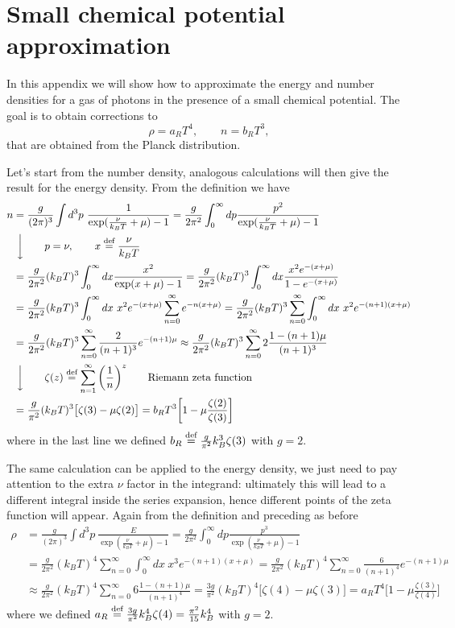 \section{Small chemical potential approximation}
\label{sec:SmallChemicalPotential}
In this appendix we will show how to approximate the energy and number densities for a gas of photons in the presence of a small chemical potential.
The goal is to obtain corrections to  
$$\rho=a_RT^4,\qquad n=b_RT^3,$$ that are obtained from the Planck distribution.

Let's start from the number density, analogous calculations will then give the result for the energy density. From the definition we have
\begin{align}
    n&=\frac{g}{(2\pi)^3}\int d^3p\ \frac{1}{\exp(\frac{\nu}{k_BT}+\mu)-1}=\frac{g}{2\pi^2}\int_0^\infty dp \frac{p^2 }{\exp(\frac{\nu}{k_BT}+\mu)-1}\nonumber\\&\ \bigg\downarrow\qquad p=\nu,\qquad x\defeq\frac{\nu}{k_BT}\nonumber\\
    &=\frac{g}{2\pi^2}(k_BT)^3\int_0^\infty dx \frac{x^2}{\exp(x+\mu)-1}=\frac{g}{2\pi^2}(k_BT)^3\int_0^\infty dx \frac{x^2e^{-(x+\mu)}}{1-e^{-(x+\mu)}}\nonumber\\&=\frac{g}{2\pi^2}(k_BT)^3\int_0^\infty dx\ x^2e^{-(x+\mu)}\sum_{n=0}^{\infty}e^{-n(x+\mu)}=\frac{g}{2\pi^2}(k_BT)^3\sum_{n=0}^{\infty}\int_0^\infty dx\ x^2e^{-(n+1)(x+\mu)}\nonumber\\&=\frac{g}{2\pi^2}(k_BT)^3\sum_{n=0}^{\infty}\frac{2}{(n+1)^3}e^{-(n+1)\mu}\approx\frac{g}{2\pi^2}(k_BT)^3\sum_{n=0}^{\infty}2\frac{1-(n+1)\mu}{(n+1)^3}\nonumber\\&\ \bigg \downarrow\qquad \zeta(z)\defeq\sum_{n=1}^\infty\bigg(\frac{1}{n}\bigg)^z\qquad\text{Riemann zeta function}\nonumber\\
    &=\frac{g}{\pi^2}(k_BT)^3\big[\zeta(3)-\mu\zeta(2)\big]=b_RT^3\bigg[1-\mu\frac{\zeta(2)}{\zeta(3)}\bigg]\,\label{eq:SmallChemicalPotential_n}
\end{align}
where in the last line we defined $b_R\stackrel{\text{def}}{=}\frac{g}{\pi^2}k_B^3\zeta(3)$ with $g=2$.

The same calculation can be applied to the energy density, we just need to pay attention to the extra $\nu$ factor in the integrand: ultimately this will lead to a different integral inside the series expansion, hence different points of the zeta function will appear. Again from the definition and preceding as before
\begin{align}
    \rho&=\frac{g}{(2\pi)^3}\int d^3p\ \frac{E}{\exp(\frac{\nu}{k_BT}+\mu)-1}=\frac{g}{2\pi^2}\int_0^\infty dp \frac{p^3}{\exp(\frac{\nu}{k_BT}+\mu)-1}\nonumber\\
    &=\frac{g}{2\pi^2}(k_BT)^4\sum_{n=0}^{\infty}\int_0^\infty dx\ x^3e^{-(n+1)(x+\mu)}\nonumber=\frac{g}{2\pi^2}(k_BT)^4\sum_{n=0}^{\infty}\frac{6}{(n+1)^4}e^{-(n+1)\mu}\\&\approx\frac{g}{2\pi^2}(k_BT)^4\sum_{n=0}^{\infty}6\frac{1-(n+1)\mu}{(n+1)^4}=\frac{3g}{\pi^2}(k_BT)^4\big[\zeta(4)-\mu\zeta(3)\big]=a_RT^4\bigg[1-\mu\frac{\zeta(3)}{\zeta(4)}\bigg]\,\label{eq:SmallChemicalPotential_rho}
\end{align}
where we defined $a_R\stackrel{\text{def}}{=}\frac{3g}{\pi^2}k_B^4\zeta(4)=\frac{\pi^2}{15}k_B^4$ with $g=2$.\\